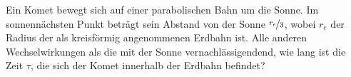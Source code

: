 \begin{Exercise}[difficulty = 3, title = Komet, origin = {Auswahlwettbewerb IPhO 2007, 3. Runde}, label = cmcomet]
	Ein Komet bewegt sich auf einer parabolischen Bahn um die Sonne. Im sonnennächsten Punkt beträgt sein Abstand von der Sonne $\nicefrac{r_e}{3}$, wobei $r_e$ der Radius der als kreisförmig angenommenen Erdbahn ist. Alle anderen Wechselwirkungen als die mit der Sonne vernachlässigendend, wie lang ist die Zeit $\tau$, die sich der Komet innerhalb der Erdbahn befindet?
\end{Exercise}